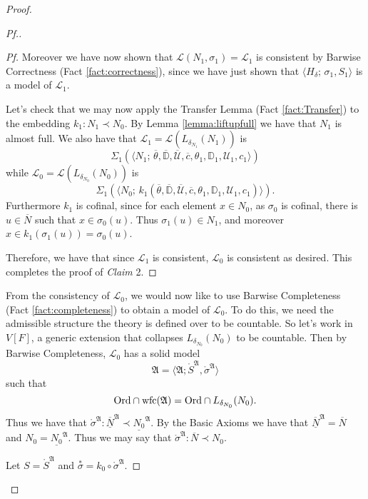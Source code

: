\documentclass{amsart}
\theoremstyle{definition}
\theoremstyle{remark}
\newcommand{\D}{\mathbb{D}}
\newcommand{\N}{{\overline{N}}}
\newcommand{\U}{\mathcal{U}}
\newcommand{\Ord}{\textup{\ensuremath{\text{Ord}}}}
\DeclareMathOperator{\wfc}{wfc}
\begin{document}
\begin{proof}
\begin{proof}[Pf.]
\begin{proof}[Pf]
Moreover we have now shown that $\mathcal L(N_1, \sigma_1) = \mathcal L_1$ is consistent by Barwise Correctness (Fact \ref{fact:correctness}), since we have just shown that $\langle H_{\delta}; \, \sigma_1, S_1 \rangle$ is a model of $\mathcal L_1$.

Let's check that we may now apply the Transfer Lemma (Fact \ref{fact:Transfer}) to the embedding $k_1:N_1 \prec N_0$. By Lemma \ref{lemma:liftupfull} we have that $N_1$ is almost full. We also have that $\mathcal L_1 = \mathcal L(L_{\delta_{N_1}}(N_1))$ is 
	$$\text{$\Sigma_1(\langle N_1; \, \overline \theta, \overline{\D}, \overline{\U}, \overline c, \theta_1, \D_1, \U_1, c_1 \rangle)$}$$ while $\mathcal L_0=\mathcal L(L_{\delta_{N_0}}(N_0))$ is 
	$$\text{$\Sigma_1(\langle N_0;\,k_1(\overline \theta, \overline{\D}, \overline{\U}, \overline c, \theta_1, \D_1, \U_1, c_1)\rangle)$.}$$ 
Furthermore $k_1$ is cofinal, since for each element $x \in N_0$, as $\sigma_0$ is cofinal, there is $u \in \N$ such that $x \in \sigma_0(u)$. Thus $\sigma_1(u) \in N_1$, and moreover $x \in k_1(\sigma_1(u))=\sigma_0(u)$. 

Therefore, we have that since $\mathcal L_1$ is consistent, $\mathcal L_0$ is consistent as desired. This completes the proof of \textit{Claim} 2. \end{proof}

From the consistency of $\mathcal L_0$, we would now like to use Barwise Completeness (Fact \ref{fact:completeness}) to obtain a model of $\mathcal L_0$. To do this, we need the admissible structure the theory is defined over to be countable. So let's work in $V[F]$, a generic extension that collapses $L_{\delta_{N_0}}(N_0)$ to be countable. Then by Barwise Completeness, $\mathcal L_0$ has a solid model 
	$$\mathfrak A = \langle \mathfrak A; \mathring{S}^{\mathfrak A}, \mathring{\sigma}^{\mathfrak A} \rangle$$ such that $$\Ord \cap \wfc(\mathfrak A) = \Ord \cap L_{\delta_{N_0}}(N_0).$$ 
Thus we have that $\mathring \sigma^{\mathfrak A}: \overline{\underline N}^{\mathfrak A} \prec \underline{N_0}^{\mathfrak A}$. By the \textsf{Basic Axioms} we have that $\overline{\underline N}^{\mathfrak A}=\N$ and $N_0=\underline{N_0}^{\mathfrak A}$. Thus we may say that  $\mathring \sigma^{\mathfrak A}: \N \prec N_0$. 

Let $S = \mathring{S}^{\mathfrak A}$ and $\overset{*} {\sigma}=k_0 \circ \mathring{\sigma}^{\mathfrak A}$. 


\end{proof}
\end{proof}
\end{document}
